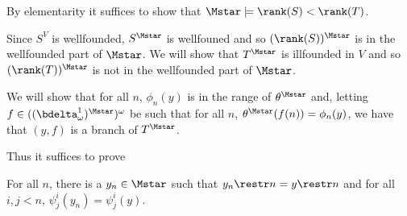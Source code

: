 \documentclass[oneside,12pt]{amsart}
\begin{document}
By elementarity it suffices to show that $\Mstar \models \rank(S) < \rank(T)$.

Since $S^V$ is wellfounded, $S^{\Mstar}$ is wellfouned and so $(\rank(S))^{\Mstar}$ is in the
wellfounded part of $\Mstar$. We will show that $T^{\Mstar}$
is illfounded in $V$ and so $(\rank(T))^{\Mstar}$ is not in the wellfounded part of $\Mstar$.

We will show that for all $n$, $\phi_n(y)$ is in the range of $\theta^{\Mstar}$ and,
letting $f\in ((\bdelta^1_\omega)^{\Mstar})^{\omega}$ be such that for all $n$,
$\theta^{\Mstar}(f(n)) = \phi_n(y)$, we have that $(y,f)$ is a branch of $T^{\Mstar}$.

Thus it suffices to prove

\begin{lemma}
For all $n$, there is a $y_n\in \Mstar$ such that $y_n\restr n = y \restr n$ and
for all $i,j < n$, $\psi^i_j(y_n) = \psi^i_j(y)$.
\end{lemma}



\end{document}
